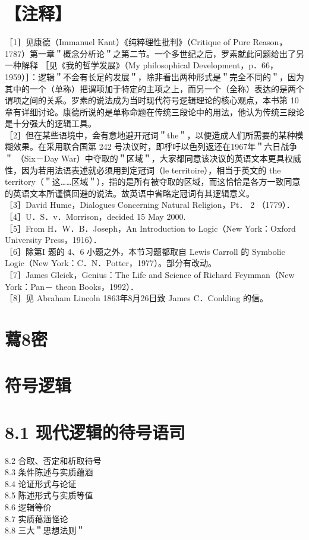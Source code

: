 \section*{【注释】}
［1］见康德（Immanuel Kant）《纯粹理性批判》（Critique of Pure Reason，1787）第一章＂概念分析论＂之第二节。一个多世纪之后，罗素就此问题给出了另一种解释 ［见《我的哲学发展》（My philosophical Development，p．66，1959）］：逻辑＂不会有长足的发展＂，除非看出两种形式是＂完全不同的＂，因为其中的一个（单称）把谓项加于特定的主项之上，而另一个（全称）表达的是两个谓项之间的关系。罗素的说法成为当时现代符号逻辑理论的核心观点，本书第 10 章有详细讨论。康德所说的是单称命题在传统三段论中的用法，他认为传统三段论是十分强大的逻辑工具。\\
［2］但在某些语境中，会有意地避开冠词＂the＂，以便造成人们所需要的某种模糊效果。在采用联合国第 242 号决议时，即㭔吁以色列返还在1967年＂六日战争＂ （Six－Day War）中夺取的＂区域＂，大家都同意该决议的英语文本更具权威性，因为若用法语表述就必须用到定冠词（le territoire），相当于英文的 the territory（＂这……区域＂），指的是所有被夺取的区域，而这恰恰是各方一致同意的英语文本所谨慎回避的说法。故英语中省略定冠词有其逻辑意义。\\
［3］David Hume，Dialogues Concerning Natural Religion，Pt． 2 （1779）．\\
［4］U．S．v．Morrison，decided 15 May 2000.\\
［5］From H．W．B．Joseph，An Introduction to Logic（New York：Oxford University Press，1916）．\\
［6］除第I 题的 4、6 小题之外，本节习题都取自 Lewis Carroll 的 Symbolic Logic（New York：C．N．Potter，1977）。部分有改动。\\
［7］James Gleick，Genius：The Life and Science of Richard Feymman（New York：Pan－ theon Books，1992）．\\
［8］见 Abraham Lincoln 1863年8月26日致 James C．Conkling 的信。

\section*{藛8密}
\section*{符号逻辑}
\section*{8.1 现代逻辑的待号语司}
8.2 合取、否定和析取待号\\
8.3 条件陈述与实质蕴涵\\
8.4 论证形式与论证\\
8.5 陈述形式与实质等值\\
8.6 逻辑等价\\
8.7 实质䔾涵怪论\\
8.8 三大＂思想法则＂

